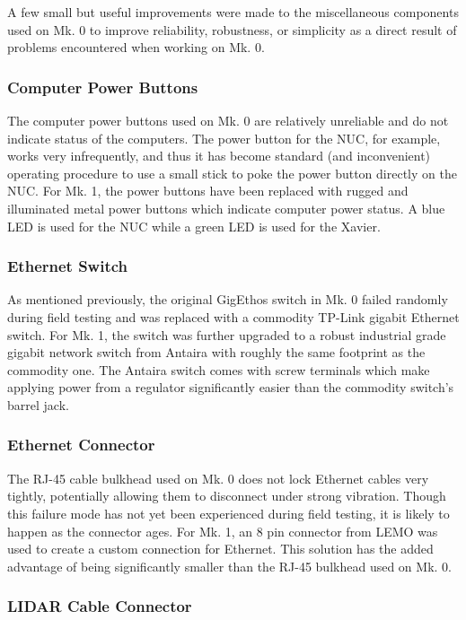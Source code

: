 A few small but useful improvements were made to the miscellaneous components used on Mk. 0 to improve reliability, robustness, or simplicity as a direct result of problems encountered when working on Mk. 0.

\subsubsection{Computer Power Buttons}

The computer power buttons used on Mk. 0 are relatively unreliable and do not indicate status of the computers. The power button for the NUC, for example, works very infrequently, and thus it has become standard (and inconvenient) operating procedure to use a small stick to poke the power button directly on the NUC. For Mk. 1, the power buttons have been replaced with rugged and illuminated metal power buttons which indicate computer power status. A blue LED is used for the NUC while a green LED is used for the Xavier.


\subsubsection{Ethernet Switch}

As mentioned previously, the original GigEthos switch in Mk. 0 failed randomly during field testing and was replaced with a commodity TP-Link gigabit Ethernet switch. For Mk. 1, the switch was further upgraded to a robust industrial grade gigabit network switch from Antaira with roughly the same footprint as the commodity one. The Antaira switch comes with screw terminals which make applying power from a regulator significantly easier than the commodity switch's barrel jack.

\subsubsection{Ethernet Connector}

The RJ-45 cable bulkhead used on Mk. 0 does not lock Ethernet cables very tightly, potentially allowing them to disconnect under strong vibration. Though this failure mode has not yet been experienced during field testing, it is likely to happen as the connector ages. For Mk. 1, an 8 pin connector from LEMO was used to create a custom connection for Ethernet. This solution has the added advantage of being significantly smaller than the RJ-45 bulkhead used on Mk. 0.

\subsubsection{LIDAR Cable Connector}

